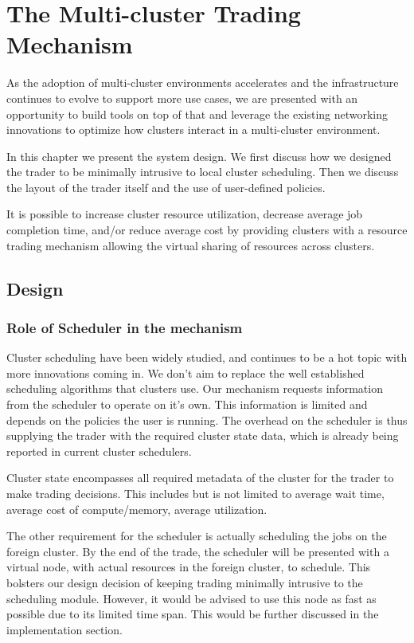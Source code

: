 
\chapter{The Multi-cluster Trading Mechanism}

As the adoption of multi-cluster environments accelerates and the
infrastructure continues to evolve to support more use cases, we are presented
with an opportunity to build tools on top of that and leverage the existing
networking innovations to optimize how clusters interact in a multi-cluster
environment. 

In this chapter we present the system design. We first discuss how we designed
the trader to be minimally intrusive to local cluster scheduling. Then we
discuss the layout of the trader itself and the use of user-defined policies. 

It is possible to increase cluster resource utilization, decrease average job
completion time, and/or reduce average cost by providing clusters with a
resource trading mechanism allowing the virtual sharing of resources across
clusters. 

\section{Design}

\subsection{Role of Scheduler in the mechanism}

Cluster scheduling have been widely studied, and continues to be a hot topic
with more innovations coming in. We don't aim to replace the well established
scheduling algorithms that clusters use. Our mechanism requests information
from the scheduler to operate on it's own. This information is limited and
depends on the policies the user is running. The overhead on the scheduler is
thus supplying the trader with the required cluster state data, which is
already being reported in current cluster schedulers. 

Cluster state encompasses all required metadata of the cluster for the trader
to make trading decisions. This includes but is not limited to average wait
time, average cost of compute/memory, average utilization. 

The other requirement for the scheduler is actually scheduling the jobs on the
foreign cluster. By the end of the trade, the scheduler will be presented with
a virtual node, with actual resources in the foreign cluster, to schedule. This
bolsters our design decision of keeping trading minimally intrusive to the
scheduling module. However, it would be advised to use this node as fast as
possible due to its limited time span. This would be further discussed in the
implementation section.  

